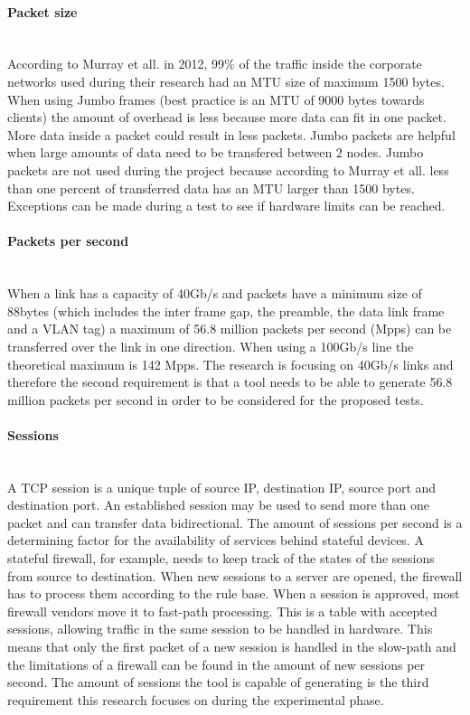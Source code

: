 \paragraph{Packet size}\label{par:packetsize}\mbox{}\\
According to Murray et all. \cite{murray2012state}  in 2012, 99\% of the traffic inside the corporate networks used during their research had an MTU size of maximum 1500 bytes. 
When using Jumbo frames\cite{alliance_2017} (best practice is an MTU of 9000 bytes towards clients\cite{jet}) the amount of overhead is less because more data can fit in one packet. 
More data inside a packet could result in less packets. 
Jumbo packets are helpful when large amounts of data need to be transfered between 2 nodes.  
Jumbo packets are not used during the project because according to Murray et all. less than one percent of transferred data has an MTU larger than 1500 bytes. 
Exceptions can be made during a test to see if hardware limits can be reached.

\paragraph{Packets per second}\label{par:pps}\mbox{}\\
When a link has a capacity of 40Gb/s and packets have a minimum size of 88bytes (which includes the inter frame gap, the preamble, the data link frame and a VLAN tag) a maximum of 56.8 million packets per second (Mpps) can be transferred over the link in one direction. When using a 100Gb/s line the theoretical maximum is 142 Mpps.   
The research is focusing on 40Gb/s links and therefore the second requirement is that a tool needs to be able to generate 56.8 million packets per second in order to be considered for the proposed tests.

\paragraph{Sessions}\label{par:sessions}\mbox{}\\
A TCP session is a unique tuple of source IP, destination IP, source port and destination port. 
An established session may be used to send more than one packet and can transfer data bidirectional.
The amount of sessions per second is a determining factor for the availability of services behind stateful devices. 
A stateful firewall, for example, needs to keep track of the states of the sessions from source to destination. 
When new sessions to a server are opened, the firewall has to process them according to the rule base. 
When a session is approved, most firewall vendors move it to fast-path processing. 
This is a table with accepted sessions, allowing traffic in the same session to be handled in hardware. This means that only the first packet of a new session is handled in the slow-path and the limitations of a firewall can be found in the amount of new sessions per second.
The amount of sessions the tool is capable of generating is the third requirement this research focuses on during the experimental phase.

